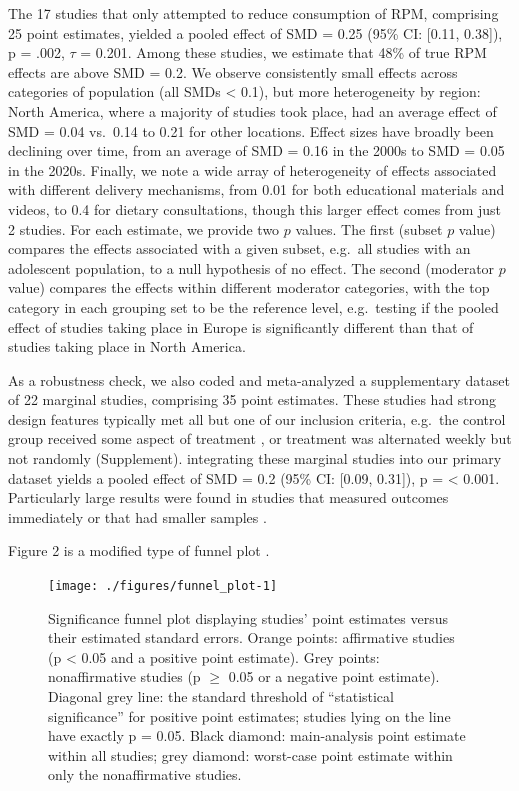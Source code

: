 \documentclass[sn-nature,referee,pdflatex]{sn-jnl}
\begin{document}
The 17 studies that only attempted to reduce consumption of RPM,
comprising 25 point estimates, yielded a pooled effect of SMD = 0.25
(95\% CI: {[}0.11, 0.38{]}), p = .002, \(\tau\) = 0.201. Among these
studies, we estimate that 48\% of true RPM effects are above SMD = 0.2.
We observe consistently small effects across categories of population
(all SMDs \textless{} 0.1), but more heterogeneity by region: North
America, where a majority of studies took place, had an average effect
of SMD = 0.04 vs.~0.14 to 0.21 for other locations. Effect sizes have
broadly been declining over time, from an average of SMD = 0.16 in the
2000s to SMD = 0.05 in the 2020s. Finally, we note a wide array of
heterogeneity of effects associated with different delivery mechanisms,
from 0.01 for both educational materials and videos, to 0.4 for dietary
consultations, though this larger effect comes from just 2 studies. For
each estimate, we provide two \(p\) values. The first (subset \(p\)
value) compares the effects associated with a given subset, e.g.~all
studies with an adolescent population, to a null hypothesis of no
effect. The second (moderator \(p\) value) compares the effects within
different moderator categories, with the top category in each grouping
set to be the reference level, e.g.~testing if the pooled effect of
studies taking place in Europe is significantly different than that of
studies taking place in North America.

As a robustness check, we also coded and meta-analyzed a supplementary
dataset of 22 marginal studies, comprising 35 point estimates. These
studies had strong design features typically met all but one of our
inclusion criteria, e.g.~the control group received some aspect of
treatment \citep{piazza2022}, or treatment was alternated weekly but not
randomly \citep{garnett2020} (Supplement). integrating these marginal
studies into our primary dataset yields a pooled effect of SMD = 0.2
(95\% CI: {[}0.09, 0.31{]}), p = \textless{} 0.001. Particularly large
results were found in studies that measured outcomes immediately
\citep{hansen2021} or that had smaller samples \citep{lentz2020}.

Figure 2 is a modified type of funnel plot \citep{mathur2020}.

\begin{figure}[H]

{\centering \texttt{[image: ./figures/funnel\_plot-1]} 

}

\caption{Significance funnel plot displaying studies’ point estimates versus their estimated standard errors. Orange points: affirmative studies (p < 0.05 and a positive point estimate). Grey points: nonaffirmative studies (p $\geq$ 0.05 or a negative point estimate). Diagonal grey line: the standard threshold of “statistical significance” for positive point estimates; studies lying on the line have exactly p = 0.05. Black diamond: main-analysis point estimate within all studies; grey diamond: worst-case point estimate within only the nonaffirmative studies.}\label{fig:funnel_plot}
\end{figure}
\end{document}
